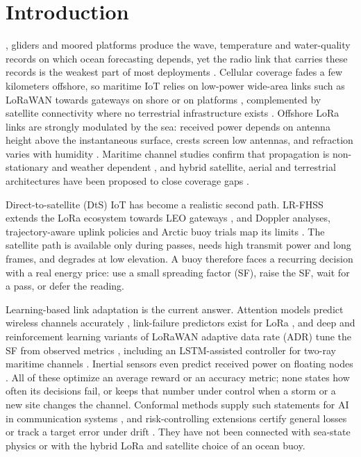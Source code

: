 \documentclass[journal]{IEEEtran}\def\WARDENieee{1}%
\begin{document}
\section{Introduction}
, gliders and moored platforms produce the wave, temperature and water-quality records on which ocean forecasting depends, yet the radio link that carries these records is the weakest part of most deployments \cite{b1,b2,b3,b4}. Cellular coverage fades a few kilometers offshore, so maritime IoT relies on low-power wide-area links such as LoRaWAN towards gateways on shore or on platforms \cite{b5,b36}, complemented by satellite connectivity where no terrestrial infrastructure exists \cite{b6,b7}. Offshore LoRa links are strongly modulated by the sea: received power depends on antenna height above the instantaneous surface, crests screen low antennas, and refraction varies with humidity \cite{b5,b8}. Maritime channel studies confirm that propagation is non-stationary and weather dependent \cite{b9,b10,b11,b12}, and hybrid satellite, aerial and terrestrial architectures have been proposed to close coverage gaps \cite{b13,b14}.

Direct-to-satellite (DtS) IoT has become a realistic second path. LR-FHSS extends the LoRa ecosystem towards LEO gateways \cite{b15,b16}, and Doppler analyses, trajectory-aware uplink policies and Arctic buoy trials map its limits \cite{b17,b18,b19}. The satellite path is available only during passes, needs high transmit power and long frames, and degrades at low elevation. A buoy therefore faces a recurring decision with a real energy price: use a small spreading factor (SF), raise the SF, wait for a pass, or defer the reading.

Learning-based link adaptation is the current answer. Attention models predict wireless channels accurately \cite{b20,b21,b22}, link-failure predictors exist for LoRa \cite{b23,b24}, and deep and reinforcement learning variants of LoRaWAN adaptive data rate (ADR) tune the SF from observed metrics \cite{b25,b26,b27}, including an LSTM-assisted controller for two-ray maritime channels \cite{b25}. Inertial sensors even predict received power on floating nodes \cite{b28}. All of these optimize an average reward or an accuracy metric; none states how often its decisions fail, or keeps that number under control when a storm or a new site changes the channel. Conformal methods supply such statements for AI in communication systems \cite{b29,b30,b31}, and risk-controlling extensions certify general losses \cite{b32,b33,b34} or track a target error under drift \cite{b35}. They have not been connected with sea-state physics or with the hybrid LoRa and satellite choice of an ocean buoy.
\end{document}
